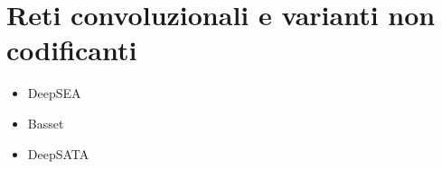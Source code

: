 \chapter{Reti convoluzionali e varianti non codificanti}\label{chp:CNN-non-coding-variants}
% 
\begin{itemize}
    \item DeepSEA\,\cite[``Predicting effects of noncoding variants with deep learning--based sequence model'']{zhou2015predicting}
    \item Basset\,\cite[``Basset: learning the regulatory code of the accessible genome with deep convolutional neural networks'']{kelley2016basset}
    \item DeepSATA\,\cite[``DeepSATA: A Deep Learning-Based Sequence Analyzer Incorporating the Transcription Factor Binding Affinity to Dissect the Effects of Non-Coding Genetic Variants'']{ma2023deepsata}
\end{itemize}


